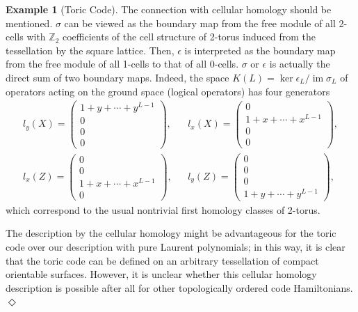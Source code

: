 \documentclass[letterpaper,12pt]{amsart}
\theoremstyle{definition} \newtheorem{defn}{Definition}
\theoremstyle{definition} \newtheorem{rem}{Remark}
\theoremstyle{definition} \newtheorem{example}{Example}
\newcommand{\im}{\mathop{\mathrm{im}}}
\begin{document}
\begin{example}[Toric Code]
The connection with cellular homology should be mentioned.
$\sigma$ can be viewed as the boundary map
from the free module of all 2-cells with $\mathbb{Z}_2$ coefficients
of the cell structure of 2-torus
induced from the tessellation by the square lattice.
Then, $\epsilon$ is interpreted as the boundary map from the free module of all 1-cells
to that of all 0-cells.
$\sigma$ or $\epsilon$ is actually the direct sum of two boundary maps.
Indeed, the space 
$K(L) = \ker \epsilon_L / \im \sigma_L$
of operators acting on the ground space (logical operators)
has four generators
\begin{align*}
 l_y(X) = \begin{pmatrix} 1+y+\cdots+y^{L-1} \\ 0 \\ 0 \\ 0 \end{pmatrix}, & & 
 l_x(X) = \begin{pmatrix} 0 \\ 1+ x+ \cdots + x^{L-1} \\ 0 \\ 0 \end{pmatrix}, \\
 l_x(Z) = \begin{pmatrix} 0 \\ 0 \\ 1+x+\cdots+x^{L-1} \\ 0 \end{pmatrix}, & &
 l_y(Z) = \begin{pmatrix} 0 \\ 0 \\ 0 \\ 1+y+\cdots+y^{L-1} \end{pmatrix},
\end{align*}
which correspond to the usual nontrivial first homology classes of 2-torus.

The description by the cellular homology might be advantageous for the toric code
over our description with pure Laurent polynomials;
in this way, it is clear that the toric code can be defined on
an arbitrary tessellation of compact orientable surfaces.
However, it is unclear whether this cellular homology description
is possible after all for other topologically ordered code Hamiltonians.
\hfill $\Diamond$
\end{example}
\end{document}
